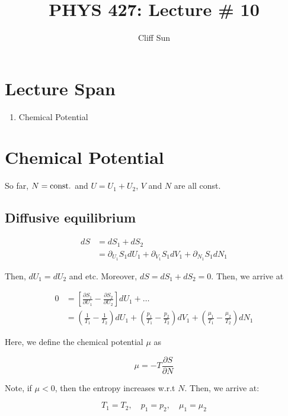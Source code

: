 \documentclass{article}
\title{PHYS 427: Lecture \# 10}
\author{Cliff Sun}
\newtheorem{one minute paper}[theorem]{One Minute Paper}
\begin{document}
\maketitle

\section*{Lecture Span}
\begin{enumerate}
    \item Chemical Potential
\end{enumerate}

\section*{Chemical Potential}

So far, $N = \rm const.$ and $U = U_1 + U_2$, $V$ and $N$ are all const. 

\subsection*{Diffusive equilibrium}

\begin{align}
    dS &= dS_1 + dS_2 \\
    &= \partial_{U_1}S_1 dU_1 + \partial_{V_1}S_1 dV_1 + \partial_{N_1}S_1 dN_1
\end{align}

Then, $dU_1 = dU_2$ and etc. Moreover, $dS = dS_1 + dS_2 = 0$. Then, we arrive at 

\begin{align}
    0 &= \left[ \frac{\partial S_1}{\partial U_1} - \frac{\partial S_2}{\partial U_2} \right]dU_1 + \dots \\
    &= \left( \frac{1}{T_1} - \frac{1}{T_2} \right)dU_1 + \left( \frac{p_1}{T_1} - \frac{p_2}{T_2} \right)dV_1 + \left( \frac{\mu_1}{T_1} - \frac{\mu_2}{T_2} \right)dN_1
\end{align}

Here, we define the chemical potential $\mu$ as 

\begin{equation}
    \mu = -T\frac{\partial S}{\partial N}
\end{equation}

Note, if $\mu < 0$, then the entropy increases w.r.t $N$. Then, we arrive at: 

\begin{equation}
    T_1 = T_2, \quad p_1 = p_2, \quad \mu_1 = \mu_2
\end{equation}
\end{document}
